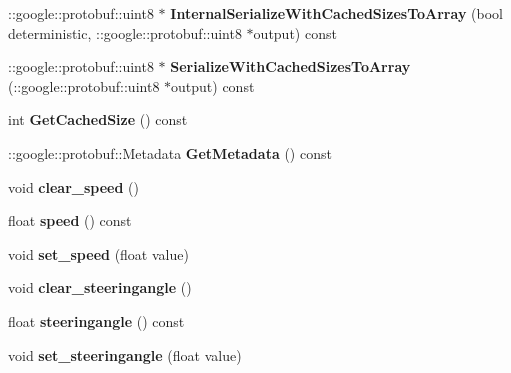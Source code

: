 \begin{DoxyCompactItemize}
\+::google\+::protobuf\+::uint8 $\ast$ {\bfseries Internal\+Serialize\+With\+Cached\+Sizes\+To\+Array} (bool deterministic, \+::google\+::protobuf\+::uint8 $\ast$output) const
\item 
\mbox{\label{classcontrol_data_1_1_chassis_info_afa9a09d5ba3cae22df18773560056fab}} 
\+::google\+::protobuf\+::uint8 $\ast$ {\bfseries Serialize\+With\+Cached\+Sizes\+To\+Array} (\+::google\+::protobuf\+::uint8 $\ast$output) const
\item 
\mbox{\label{classcontrol_data_1_1_chassis_info_ac8749208b282fd0fd74db5c7a44a53e2}} 
int {\bfseries Get\+Cached\+Size} () const
\item 
\mbox{\label{classcontrol_data_1_1_chassis_info_a8a238920b150719b241b72765fa88dd4}} 
\+::google\+::protobuf\+::\+Metadata {\bfseries Get\+Metadata} () const
\item 
\mbox{\label{classcontrol_data_1_1_chassis_info_a54fcdf66652c6b2ec759a9707a5b5e71}} 
void {\bfseries clear\+\_\+speed} ()
\item 
\mbox{\label{classcontrol_data_1_1_chassis_info_a2087ccec9c44beb2f1b29ded03587efa}} 
float {\bfseries speed} () const
\item 
\mbox{\label{classcontrol_data_1_1_chassis_info_afd474105135f852d2c9776e2b2f8b098}} 
void {\bfseries set\+\_\+speed} (float value)
\item 
\mbox{\label{classcontrol_data_1_1_chassis_info_a81b8878a259662a14f951b7a1a6d04cf}} 
void {\bfseries clear\+\_\+steeringangle} ()
\item 
\mbox{\label{classcontrol_data_1_1_chassis_info_a69fd9465f345b112f85fe6864d50c411}} 
float {\bfseries steeringangle} () const
\item 
\mbox{\label{classcontrol_data_1_1_chassis_info_af019272f0e54d4ec9c3c0645b8f69ba4}} 
void {\bfseries set\+\_\+steeringangle} (float value)

\end{DoxyCompactItemize}
